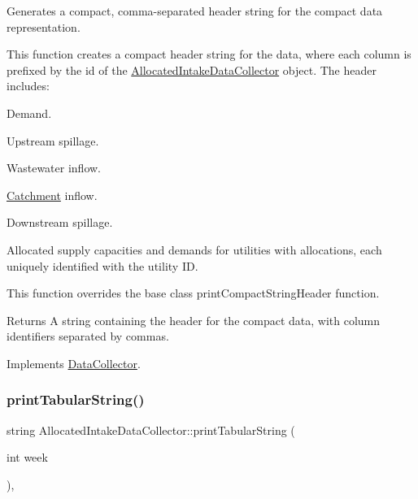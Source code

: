 Generates a compact, comma-\/separated header string for the compact data representation. 

This function creates a compact header string for the data, where each column is prefixed by the {\ttfamily id} of the \mbox{\hyperlink{classAllocatedIntakeDataCollector}{Allocated\+Intake\+Data\+Collector}} object. The header includes\+:
\begin{DoxyItemize}
\item Demand.
\item Upstream spillage.
\item Wastewater inflow.
\item \mbox{\hyperlink{classCatchment}{Catchment}} inflow.
\item Downstream spillage.
\item Allocated supply capacities and demands for utilities with allocations, each uniquely identified with the utility ID.
\end{DoxyItemize}

This function overrides the base class {\ttfamily print\+Compact\+String\+Header} function.

\begin{DoxyReturn}{Returns}
A string containing the header for the compact data, with column identifiers separated by commas. 
\end{DoxyReturn}


Implements \mbox{\hyperlink{classDataCollector_a98dcb4ec871d9c7fbf7545c64e5ccc67}{Data\+Collector}}.

\mbox{\label{classAllocatedIntakeDataCollector_a8568c28b643b9a9199e2b91ae5ebbe83}} 
\subsubsection{\texorpdfstring{print\+Tabular\+String()}{printTabularString()}}
{\footnotesize\ttfamily string Allocated\+Intake\+Data\+Collector\+::print\+Tabular\+String (\begin{DoxyParamCaption}\item[{int}]{week }\end{DoxyParamCaption})\hspace{0.3cm}{\ttfamily [override]}, {\ttfamily [virtual]}}



